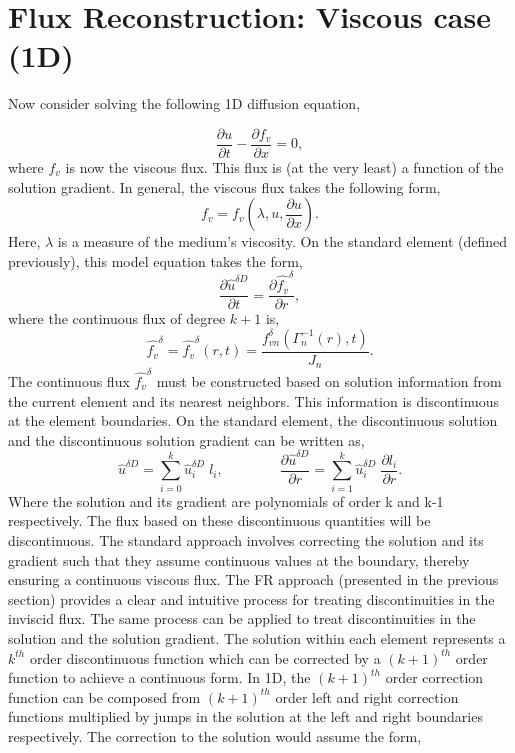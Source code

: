 \section{Flux Reconstruction: Viscous case (1D)}
\begin{raggedleft}
Now consider solving the following 1D diffusion equation,
\end{raggedleft}
\begin{equation}
\frac{\partial u}{\partial t} - \frac{\partial f_{v}}{\partial x} = 0,
\label{governing}
\end{equation}
%
where $f_{v}$ is now the viscous flux. This flux is (at the very least) a function of the solution gradient. In general, the viscous flux takes the following form,
%
\begin{equation}
f_{v} = f_{v} \left(\lambda, u, \frac{\partial u}{\partial x} \right).
\end{equation}
%
Here, $\lambda$ is a measure of the medium's viscosity. On the standard element (defined previously), this model equation takes the form,
%
\begin{equation}
\frac{\partial\hat{u}^{\delta D}}{\partial t} = \frac{\partial\hat{f_{v}}^{\delta}}{\partial r},
\end{equation}
%
where the continuous flux of degree $k+1$ is, 
%
\begin{equation}
\hat{f_v}^{\delta}=\hat{f_v}^{\delta}(r,t)=\frac{f^{\delta}_{v n}(\Gamma_n^{-1}(r),t)}{J_n}.
\end{equation}
%
The continuous flux $\hat{f_{v}}^{\delta}$ must be constructed based on solution information from the current element and its nearest neighbors. This information is discontinuous at the element boundaries. On the standard element, the discontinuous solution and the discontinuous solution gradient can be written as,
%
\begin{equation}
\hat{u}^{\delta D}=\sum_{i=0}^{k}\hat{u}^{\delta D}_{i}\;l_i,		\qquad \qquad		\frac {\partial \hat{u}^{\delta D}}{\partial r}=\sum_{i=1}^{k}\hat{u}^{\delta D}_{i}\; \frac{\partial l_i}{\partial r}.
\end{equation}
%
Where the solution and its gradient are polynomials of order k and k-1 respectively. The flux based on these discontinuous quantities will be discontinuous. The standard approach involves correcting the solution and its gradient such that they assume continuous values at the boundary, thereby ensuring a continuous viscous flux. The FR approach (presented in the previous section) provides a clear and intuitive process for treating discontinuities in the inviscid flux. The same process can be applied to treat discontinuities in the solution and the solution gradient. The solution within each element represents a $k^{th}$ order discontinuous function which can be corrected by a $(k+1)^{th}$ order function to achieve a continuous form. In 1D, the $(k+1)^{th}$ order correction function can be composed from $(k+1)^{th}$ order left and right correction functions multiplied by jumps in the solution at the left and right boundaries respectively. The correction to the solution would assume the form,
